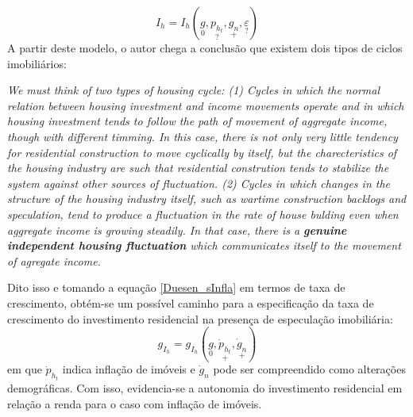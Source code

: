 \begin{equation}
\label{Duesen_sInfla}
I_h = I_h(\underset{0}{g}, \underset{?}{p_{h_t}}, \underset{+}{g_n}, \underset{?}{\varepsilon})
\end{equation}
A partir deste modelo, o autor chega a conclusão que existem dois tipos de ciclos imobiliários:
\begin{citacao}
\textit{We must think of two types of housing cycle: (1) Cycles in which the normal relation between housing investment and income movements operate and  in which housing investment tends to follow the path of movement of aggregate income, though with different timming.
In this case, there is not only very little tendency for residential construction to move cyclically by itself, but the charecteristics of the housing industry are such that residential constrution tends to  stabilize the system against other sources of fluctuation.
(2) Cycles in which changes in the structure of the housing industry itself, such as wartime construction backlogs and speculation, tend to produce a fluctuation in the rate of house bulding even when aggregate income is growing steadily. 
In that case, there is a \textbf{genuine independent housing fluctuation} which communicates itself to the movement of agregate income.}
\cite[p.~164. grifos adicionados]{duesenberry_investment_1958}
\end{citacao}
Dito isso e tomando a equação \ref{Duesen_sInfla} em termos de taxa de crescimento, obtém-se um possível caminho para a especificação da taxa de crescimento do investimento residencial na presença de especulação imobiliária:
\begin{equation}
\label{gZ_Duesenberry}
g_{I_h} = g_{I_h}(\underset{0}{g}, \underset{+}{\dot p_{h_t}}, \underset{+}{\dot g_n})
\end{equation}
em que $\dot p_{h_t}$ indica inflação de imóveis e $\dot g_n$ pode ser compreendido como alterações demográficas.
Com isso, evidencia-se a autonomia do investimento residencial em relação a renda para o caso com inflação de imóveis.


